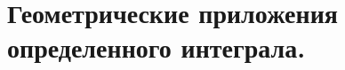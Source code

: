 \documentclass[../main.tex]{subfiles}
\begin{document}
\chapter{Геометрические приложения определенного интеграла.}

\end{document}
